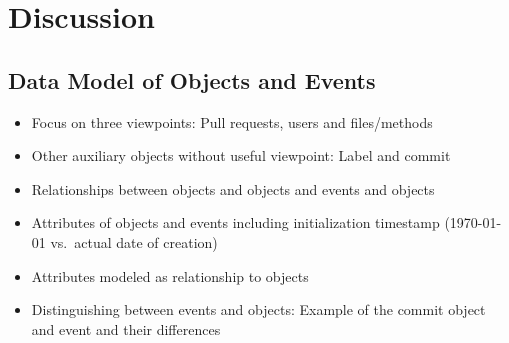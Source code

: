 \chapter{Discussion}
\label{chap:discussion}

\section{Data Model of Objects and Events}
\begin{itemize}
	\item Focus on three viewpoints: Pull requests, users and files/methods
	\item Other auxiliary objects without useful viewpoint: Label and commit
	\item Relationships between objects and objects and events and objects
	\item Attributes of objects and events including initialization timestamp (1970-01-01 vs.\ actual date of creation)
	\item Attributes modeled as relationship to objects
	\item Distinguishing between events and objects: Example of the commit object and event and their differences
\end{itemize}